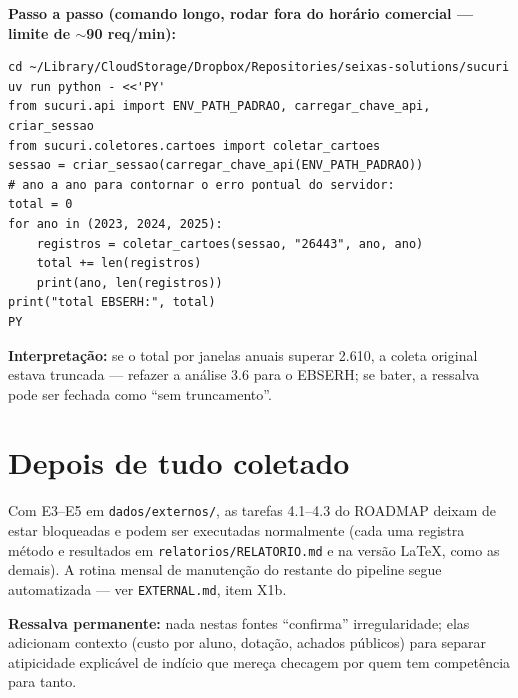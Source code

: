 \documentclass[11pt,a4paper]{article}
\begin{document}
\textbf{Passo a passo (comando longo, rodar fora do horário comercial ---
limite de $\sim$90 req/min):}
\begin{lstlisting}
cd ~/Library/CloudStorage/Dropbox/Repositories/seixas-solutions/sucuri
uv run python - <<'PY'
from sucuri.api import ENV_PATH_PADRAO, carregar_chave_api, criar_sessao
from sucuri.coletores.cartoes import coletar_cartoes
sessao = criar_sessao(carregar_chave_api(ENV_PATH_PADRAO))
# ano a ano para contornar o erro pontual do servidor:
total = 0
for ano in (2023, 2024, 2025):
    registros = coletar_cartoes(sessao, "26443", ano, ano)
    total += len(registros)
    print(ano, len(registros))
print("total EBSERH:", total)
PY
\end{lstlisting}

\textbf{Interpretação:} se o total por janelas anuais superar 2.610, a
coleta original estava truncada --- refazer a análise 3.6 para o EBSERH;
se bater, a ressalva pode ser fechada como ``sem truncamento''.

\section*{Depois de tudo coletado}

Com E3--E5 em \texttt{dados/externos/}, as tarefas 4.1--4.3 do ROADMAP
deixam de estar bloqueadas e podem ser executadas normalmente (cada uma
registra método e resultados em \texttt{relatorios/RELATORIO.md} e na
versão LaTeX, como as demais). A rotina mensal de manutenção do restante
do pipeline segue automatizada --- ver \texttt{EXTERNAL.md}, item X1b.

\textbf{Ressalva permanente:} nada nestas fontes ``confirma''
irregularidade; elas adicionam contexto (custo por aluno, dotação,
achados públicos) para separar atipicidade explicável de indício que
mereça checagem por quem tem competência para tanto.
\end{document}
